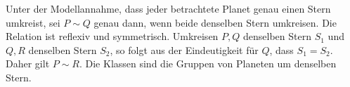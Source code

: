 \begin{beispiel}
Unter der Modellannahme, dass jeder betrachtete Planet genau einen Stern
umkreist, sei $P\sim Q$ genau dann, wenn beide denselben Stern umkreisen.
Die Relation ist reflexiv und symmetrisch. Umkreisen $P,Q$ denselben
Stern $S_1$ und $Q,R$ denselben Stern $S_2$, so folgt aus der Eindeutigkeit
für $Q$, dass $S_1=S_2$. Daher gilt $P\sim R$.
Die Klassen sind die Gruppen von Planeten um denselben Stern.
\end{beispiel}
